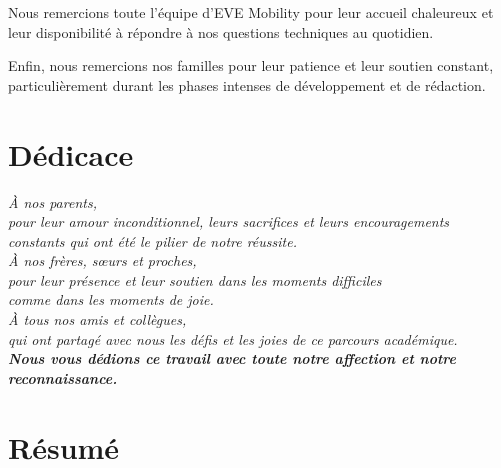\documentclass[12pt, a4paper]{report}
\begin{document}
Nous remercions toute l'équipe d'EVE Mobility pour leur accueil chaleureux et leur
disponibilité à répondre à nos questions techniques au quotidien.

Enfin, nous remercions nos familles pour leur patience et leur soutien constant, particulièrement
durant les phases intenses de développement et de rédaction.

\chapter*{Dédicace}
\thispagestyle{fancy}

\vspace{2cm}

\begin{center}
  \textit{À nos parents,}\\[0.5em]
  \textit{pour leur amour inconditionnel, leurs sacrifices et leurs encouragements}\\
  \textit{constants qui ont été le pilier de notre réussite.}\\[1.5em]

  \textit{À nos frères, sœurs et proches,}\\[0.5em]
  \textit{pour leur présence et leur soutien dans les moments difficiles}\\
  \textit{comme dans les moments de joie.}\\[1.5em]

  \textit{À tous nos amis et collègues,}\\[0.5em]
  \textit{qui ont partagé avec nous les défis et les joies de ce parcours académique.}\\[2em]

  \textbf{\textit{Nous vous dédions ce travail avec toute notre affection et notre reconnaissance.}}
\end{center}

\chapter*{Résumé}
\thispagestyle{fancy}
\end{document}

